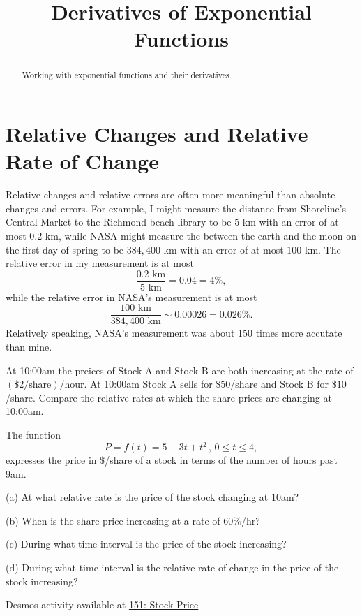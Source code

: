 \documentclass{ximera}
\title{Derivatives of Exponential Functions}
\begin{document}
\begin{abstract}
Working with exponential functions and their derivatives.
\end{abstract}
\maketitle


\section*{Relative Changes and Relative Rate of Change}
Relative changes and relative errors are often more meaningful than absolute changes and errors. For example, I might measure the distance from Shoreline's Central Market to the Richmond beach library to be $5$ km with an  error of at most $0.2$ km, while NASA might measure the between the earth and the moon on the first day of spring to be $384,400$ km with an error of at most $100$ km. The relative error in my measurement is at most
\[
  \frac{0.2 \text{ km} }{5 \text{ km}} = 0.04 = 4\% ,
\] 
while the relative error in NASA's measurement is at most
\[ 
   \frac{100 \text{ km} }{384,400 \text{ km}} \sim 0.00026 = 0.026\% .
\]
Relatively speaking, NASA's measurement was about 150 times more accutate than mine.

\begin{question}  \label{Qfnljhn}
At 10:00am the preices of Stock A and Stock B are both increasing at the rate of $(\$2/\text{share})/\text{hour}$. At 10:00am Stock A sells for $\$50$/share and Stock B for $\$10$/share. Compare the relative rates at which the share prices are changing at 10:00am.
\end{question}


\begin{question} \label{Q43tbbtt}
The function 
\[
      P = f(t) = 5 -3t + t^2 \, , \, 0\leq t \leq 4 , 
\]
expresses the price in $\$$/share of a stock in terms of the number of hours past 9am.

(a) At what relative rate is the price of the stock changing at 10am? 

(b) When is the share price increasing at a rate of $60\%$/hr?

(c) During what time interval is the price of the stock increasing?

(d) During what time interval is the relative rate of change in the price of the stock increasing? 

\begin{onlineOnly}
    \begin{center}
\end{center}
\end{onlineOnly}

Desmos activity available at \href{https://www.desmos.com/calculator/hhkveu6lxp}{151: Stock Price}
\end{question}
\end{document}
